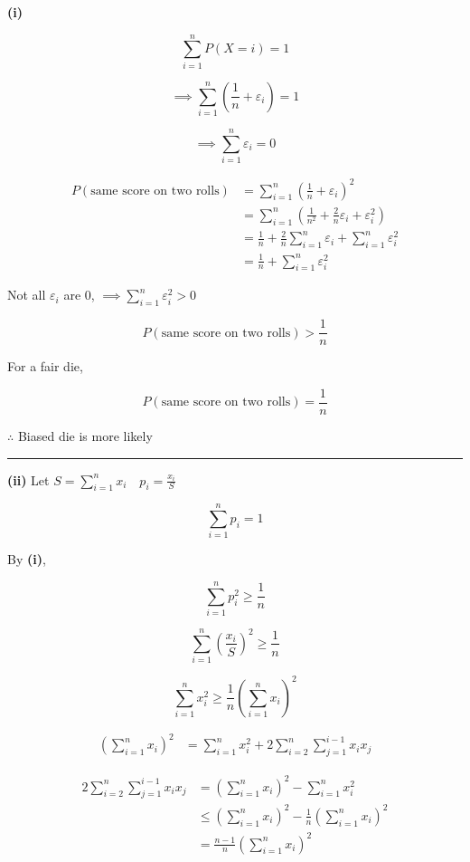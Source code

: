 \documentclass[12pt]{article}
\begin{document}
\newcommand{\ds}{\displaystyle}

\textbf{(i)}

$$\sum_{i=1}^n P(X=i)=1$$

$$\implies \sum_{i=1}^n\left(\frac1n+\varepsilon_i\right)=1$$

$$\implies \sum_{i=1}^n\varepsilon_i=0$$

\begin{align*}
P(\text{same score on two rolls})
&=\sum_{i=1}^n\left(\frac1n+\varepsilon_i\right)^2\\
&=\sum_{i=1}^n\left(\frac1{n^2}+\frac2n\varepsilon_i+\varepsilon_i^2\right)\\
&=\frac1n+\frac2n\sum_{i=1}^n\varepsilon_i+\sum_{i=1}^n\varepsilon_i^2\\
&=\frac1n+\sum_{i=1}^n\varepsilon_i^2
\end{align*}

Not all $\varepsilon_i$ are $0$, $\implies \ds \sum_{i=1}^n\varepsilon_i^2>0$

$$P(\text{same score on two rolls})>\frac1n$$

For a fair die,

$$P(\text{same score on two rolls})=\frac1n$$

$\therefore $ Biased die is more likely

\bigskip\hrule\bigskip

\textbf{(ii)} Let $S=\ds\sum_{i=1}^n x_i\quad p_i=\frac{x_i}{S}$

$$\sum_{i=1}^n p_i=1$$

By \textbf{(i)},

$$\sum_{i=1}^n p_i^2\geq\frac1n$$

$$\sum_{i=1}^n\left(\frac{x_i}{S}\right)^2\geq\frac1n$$

$$\sum_{i=1}^n x_i^2\geq \frac1n\left(\sum_{i=1}^n x_i\right)^2$$

\begin{align*}
\left(\sum_{i=1}^n x_i\right)^2
&=\sum_{i=1}^n x_i^2+2\sum_{i=2}^n\sum_{j=1}^{i-1}x_ix_j
\end{align*}

\begin{align*}
2\sum_{i=2}^n\sum_{j=1}^{i-1}x_ix_j
&=\left(\sum_{i=1}^n x_i\right)^2-\sum_{i=1}^n x_i^2\\
&\leq \left(\sum_{i=1}^n x_i\right)^2-\frac1n\left(\sum_{i=1}^n x_i\right)^2\\
&=\frac{n-1}{n}\left(\sum_{i=1}^n x_i\right)^2
\end{align*}
\end{document}
